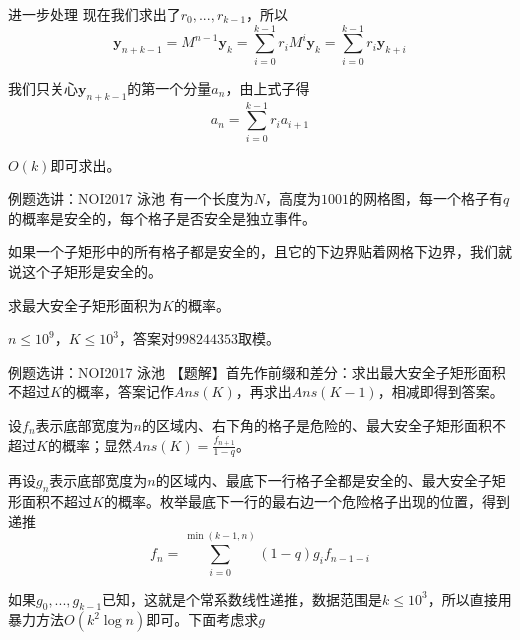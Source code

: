 \documentclass{beamer}
\begin{document}
\begin{frame}{进一步处理}
    \small 
    现在我们求出了$r_0,...,r_{k-1}$，所以
    \begin{equation*}
        \mathbf{y}_{n+k-1}=M^{n-1}\mathbf{y}_k=\sum_{i=0}^{k-1} r_i M^i\mathbf{y}_k=\sum_{i=0}^{k-1} r_i \mathbf{y}_{k+i}
    \end{equation*}

    \pause 我们只关心$\mathbf{y}_{n+k-1}$的第一个分量$a_n$，由上式子得
    \begin{equation*}
        a_n=\sum_{i=0}^{k-1} r_i a_{i+1}
    \end{equation*}

    $O(k)$即可求出。
\end{frame}

\begin{frame}{例题选讲：NOI2017 泳池}
    \small 
    有一个长度为$N$，高度为$1001$的网格图，每一个格子有$q$的概率是安全的，每个格子是否安全是独立事件。
    \vspace{.5em}

    如果一个子矩形中的所有格子都是安全的，且它的下边界贴着网格下边界，我们就说这个子矩形是安全的。
    \vspace{.5em}

    求最大安全子矩形面积为$K$的概率。
    \vspace{.5em}

    $n\leq 10^9$，$K\leq 10^3$，答案对$998244353$取模。
\end{frame}

\begin{frame}{例题选讲：NOI2017 泳池}
    \small 
    【题解】首先作前缀和差分：求出最大安全子矩形面积不超过$K$的概率，答案记作$Ans(K)$，再求出$Ans(K-1)$，相减即得到答案。
    \vspace{1em}

    \pause 设$f_n$表示底部宽度为$n$的区域内、右下角的格子是危险的、最大安全子矩形面积不超过$K$的概率；显然$Ans(K)=\frac{f_{n+1}}{1-q}$。
    \vspace{1em}

    \pause 再设$g_n$表示底部宽度为$n$的区域内、最底下一行格子全都是安全的、最大安全子矩形面积不超过$K$的概率。\pause 枚举最底下一行的最右边一个危险格子出现的位置，得到递推
    \begin{equation*}
        f_n=\sum_{i=0}^{\min(k-1,n)}(1-q)g_i f_{n-1-i}
    \end{equation*}

    \pause 如果$g_0,...,g_{k-1}$已知，这就是个常系数线性递推，数据范围是$k\leq 10^3$，所以直接用暴力方法$O(k^2\log n)$即可。下面考虑求$g$
\end{frame}
\end{document}
